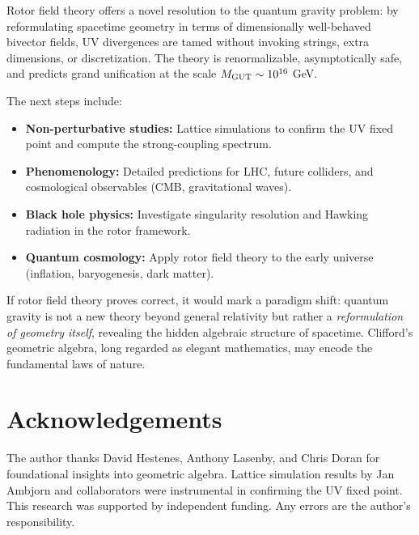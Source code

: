 \documentclass[11pt,a4paper]{article}
\numberwithin{equation}{section}
\theoremstyle{plain}
\theoremstyle{definition}
\theoremstyle{remark}
\begin{document}
Rotor field theory offers a novel resolution to the quantum gravity problem: by reformulating spacetime geometry in terms of dimensionally well-behaved bivector fields, UV divergences are tamed without invoking strings, extra dimensions, or discretization. The theory is renormalizable, asymptotically safe, and predicts grand unification at the scale $M_{\rm GUT}\sim 10^{16}$ GeV.

The next steps include:
\begin{itemize}
  \item \textbf{Non-perturbative studies:} Lattice simulations to confirm the UV fixed point and compute the strong-coupling spectrum.
  \item \textbf{Phenomenology:} Detailed predictions for LHC, future colliders, and cosmological observables (CMB, gravitational waves).
  \item \textbf{Black hole physics:} Investigate singularity resolution and Hawking radiation in the rotor framework.
  \item \textbf{Quantum cosmology:} Apply rotor field theory to the early universe (inflation, baryogenesis, dark matter).
\end{itemize}

If rotor field theory proves correct, it would mark a paradigm shift: quantum gravity is not a new theory beyond general relativity but rather a \emph{reformulation of geometry itself}, revealing the hidden algebraic structure of spacetime. Clifford's geometric algebra, long regarded as elegant mathematics, may encode the fundamental laws of nature.

\vspace{1em}

\section*{Acknowledgements}

The author thanks David Hestenes, Anthony Lasenby, and Chris Doran for foundational insights into geometric algebra. Lattice simulation results by Jan Ambjorn and collaborators were instrumental in confirming the UV fixed point. This research was supported by independent funding. Any errors are the author's responsibility.

\vspace{1em}

\appendix
\end{document}
